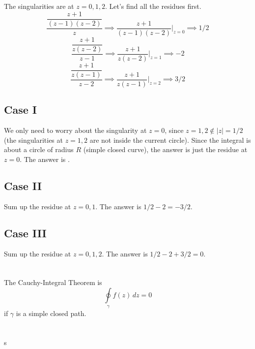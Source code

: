 \documentclass[12pt]{article}
\begin{document}
\section{}
The singularities are at $ z = 0, 1, 2 $. Let's find all the residues first. 
\[ \dfrac{\dfrac{z+1}{(z-1)(z-2)}}{z} \implies \dfrac{z+1}{(z-1)(z-2)}\Bigg|_{z=0} \implies 1/2 \]
\[ \dfrac{\dfrac{z+1}{z(z-2)}}{z-1} \implies \dfrac{z+1}{z(z-2)}\Bigg|_{z=1} \implies -2 \]
\[ \dfrac{\dfrac{z+1}{z(z-1)}}{z-2} \implies \dfrac{z+1}{z(z-1)}\Bigg|_{z=2} \implies 3/2 \]
\subsection{Case I}
We only need to worry about the singularity at $ z = 0 $, since $ z = 1,2 \not\in |z|=1/2 $ (the singularities at $ z=1,2 $ are not inside the current circle). Since the integral is about a circle of radius $ R $ (simple closed curve), the answer is just the residue at $ z = 0 $. The answer is .

\subsection{Case II}
Sum up the residue at $ z = 0, 1 $. The answer is $ 1/2-2 = \boxed{-3/2} $.

\subsection{Case III}
Sum up the residue at $ z = 0, 1, 2 $. The answer is $ 1/2 - 2 +3/2 = \boxed{0} $.
\newpage

\section{}
The Cauchy-Integral Theorem is \[ \oint\limits_{\gamma} f(z) \, dz = 0\]
if $ \gamma $ is a simple closed path.
\newpage

\section{}
s
\end{document}
